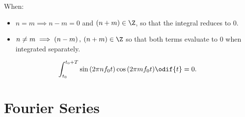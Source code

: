 \documentclass{article}
\begin{document}
When:
\begin{itemize}
    \item \(n = m \implies n - m = 0\) and \(\left( n + m \right) \in \Z\),
          so that the integral reduces to \(0\).
    \item \(n \neq m \implies \left( n - m \right),\: \left( n + m \right) \in \Z\)
          so that both terms evaluate to \(0\) when integrated separately.
\end{itemize}
\begin{equation*}
    \int_{t_0}^{t_0 + T} \sin{\left( 2\pi n f_0 t \right)} \cos{\left( 2\pi m f_0 t \right)} \odif{t} = 0.
\end{equation*}
\section{Fourier Series}
\end{document}
